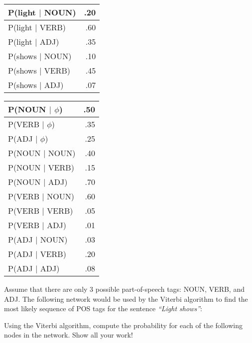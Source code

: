 \documentclass[11pt]{article}
\begin{document}
\begin{enumerate}
\begin{center}
\begin{tabular}{|lr|} \hline
P(light $\mid$ NOUN) & .20 \\ \hline
P(light $\mid$ VERB) & .60 \\ \hline
P(light $\mid$ ADJ) & .35 \\ \hline
P(shows $\mid$ NOUN) & .10 \\ \hline
P(shows $\mid$ VERB) & .45 \\ \hline
P(shows $\mid$ ADJ) & .07 \\ \hline
\end{tabular}
\hspace*{.5in}
\begin{tabular}{|lr|} \hline
P(NOUN $\mid$ $\phi$) & .50 \\ \hline
P(VERB $\mid$ $\phi$) & .35 \\ \hline
P(ADJ $\mid$ $\phi$) & .25 \\ \hline
P(NOUN $\mid$ NOUN) & .40 \\ \hline
P(NOUN $\mid$ VERB) & .15 \\ \hline
P(NOUN $\mid$ ADJ) & .70\\ \hline
P(VERB $\mid$ NOUN) & .60 \\ \hline
P(VERB $\mid$ VERB) & .05 \\ \hline
P(VERB $\mid$ ADJ) & .01 \\ \hline
P(ADJ $\mid$ NOUN) & .03 \\ \hline
P(ADJ $\mid$ VERB) & .20 \\ \hline
P(ADJ $\mid$ ADJ) & .08\\ \hline
\end{tabular}
\end{center}

Assume that there are only 3 possible part-of-speech tags: NOUN, VERB,
and ADJ. The following network would be used by the Viterbi algorithm
to find the most likely sequence of POS tags for the sentence {\it ``Light
  shows''}: 

\vspace*{.2in}
\hspace*{.5in} 
\vspace*{.2in}


\newpage

Using the Viterbi algorithm, compute the probability for each of the
following nodes in the network. Show all your work! \\


\end{enumerate}
\end{document}
